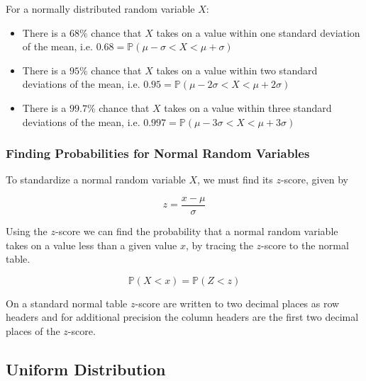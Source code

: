 \documentclass[12pt letter]{report}
\begin{document}
For a normally distributed random variable $X$:

\begin{itemize}
	\item There is a $68\%$ chance that $X$ takes on a value within one standard deviation of the mean, i.e. $0.68 = \mathbb{P}
		      \left( \mu - \sigma < X < \mu + \sigma  \right) $
	\item There is a $95\%$ chance that $X$ takes on a value within two standard deviations of the mean, i.e. $0.95 = \mathbb{P}
		      \left( \mu - 2 \sigma < X < \mu + 2 \sigma  \right) $
	\item There is a $99.7\%$ chance that $X$ takes on a value within three standard deviations of the mean, i.e. $0.997 = \mathbb{P}
		      \left( \mu - 3 \sigma < X < \mu + 3 \sigma  \right) $
\end{itemize}

\subsubsection{Finding Probabilities for Normal Random Variables}



To standardize a normal random variable $X$, we must find its $z$-score, given by

\[
	z = \frac{x - \mu }{\sigma }
\]



Using the $z$-score we can find the probability that a normal random variable takes on a value less than a given value
$x$, by tracing the $z$-score to the normal table.

\[
	\mathbb{P} \left( X < x \right) = \mathbb{P} \left( Z < z \right)
\]

On a standard normal table $z$-score are written to two decimal places as row headers and for additional precision the
column headers are the first two decimal places of the $z$-score.




\subsection{Uniform Distribution}
\end{document}
